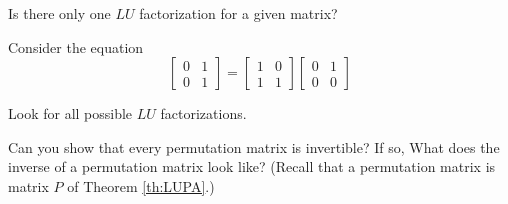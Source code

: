 \documentclass{ximera}
\begin{document}
 
 
\begin{problem}\label{prob:LU4}
Is there only one $LU$ factorization for a given matrix?
 
\begin{hint}Consider the equation
$$
\begin{bmatrix}0 & 1 \\0 & 1\end{bmatrix}=\begin{bmatrix}1& 0 \\1 & 1\end{bmatrix} \begin{bmatrix}0 & 1 \\0 & 0\end{bmatrix}
$$
 
Look for all possible $LU$ factorizations.
\end{hint}
\end{problem}
 
\begin{problem}\label{prob:LU5}
Can you show that every permutation matrix is invertible?  If so, What does the inverse of a permutation matrix look like? (Recall that a permutation matrix is matrix $P$ of Theorem \ref{th:LUPA}.)
\end{problem}
\end{document}

